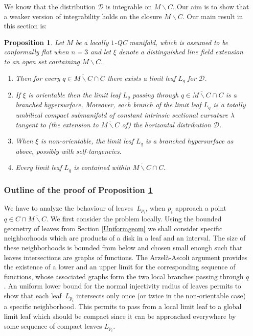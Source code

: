 \documentclass[JEP,XML,SOM,Unicode]{cedram}
\let\mathcal\mathscr
\let\moins\smallsetminus
\newtheorem{proposition}[theorem]{Proposition}
\theoremstyle{definition}
\theoremstyle{remark}
\numberwithin{equation}{section}
\begin{document}
We know that the distribution $\mathcal D$ is integrable on $M\moins C$. Our aim is to show that a weaker version of integrability
holds on the closure $\overline{M\moins C}$. Our main result in this section is:

\begin{proposition}\label{integrability}
Let $M$ be a locally $1$-QC manifold, which is assumed to be conformally flat when $n=3$ and let $\xi$ denote a distinguished line field extension to an open set containing $\overline{M\moins C}$.
\begin{enumerate}
\item Then for every $q\in \overline{M\moins C}\cap C$ there exists a limit leaf $L_q$ for $\mathcal D$.
\item If $\xi$ is orientable then the limit leaf $L_q$ passing through $q\in \overline{M\moins C}\cap C$
is a branched hypersurface. Moreover, each branch of the limit leaf $L_q$ is a totally umbilical compact submanifold of constant
intrinsic sectional curvature $\lambda$ tangent to (the extension to $\overline{M\moins C}$ of) the horizontal distribution
$\mathcal D$.
\item When $\xi$ is non-orientable, the limit leaf $L_q$ is a branched hypersurface
as above, possibly with self-tangencies.
\item Every limit leaf $L_q$ is contained within $ \overline{M\moins C}\cap C$.
\end{enumerate}
\end{proposition}

\subsubsection*{Outline of the proof of Proposition \ref{integrability}}
We have to analyze the behaviour of leaves~$L_{p_i}$, when $p_i$ approach
a point $q\in C\cap \overline{M\moins C}$. We first consider the problem locally. Using the bounded geometry of leaves from Section \ref{Uniformgeom}
we shall consider specific neighborhoods which are products of a disk in a leaf and an interval. The size of these neighborhoods is bounded from below and chosen small enough such that leaves intersections are graphs of functions. The Arzelà-Ascoli argument provides the existence
of a lower and an upper limit for the corresponding sequence of functions, whose associated graphs form the two local branches passing through
$q$. An uniform lower bound for the normal injectivity radius of leaves permits to show that each leaf~$L_{p_i}$ intersects only once (or twice in the non-orientable case) a specific \hbox{neighborhood}. This permits to pass from a local limit leaf to a global
limit leaf which should be compact since it can be approached everywhere by some sequence of compact leaves $L_{p_i}$.
\end{document}
